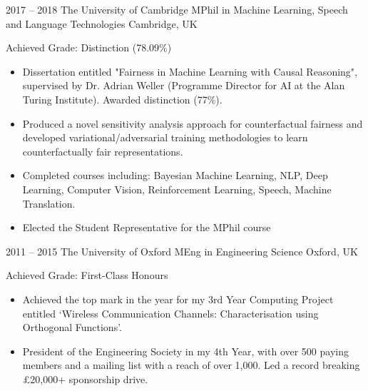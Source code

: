 \documentclass[]{friggeri-cv} %
\begin{document}
\begin{entrylist}


\entry
{2017 -- 2018}
{The University of Cambridge}
{MPhil {\normalfont in Machine Learning, Speech and Language Technologies }}
{Cambridge, UK}
{Achieved Grade: Distinction (78.09\%)
	\begin{itemize}
        \item Dissertation entitled "Fairness in Machine Learning with Causal Reasoning", supervised by Dr. Adrian Weller (Programme Director for AI at the Alan Turing Institute). Awarded distinction (77\%).
        \item Produced a novel sensitivity analysis approach for counterfactual fairness and developed variational/adversarial training methodologies to learn counterfactually fair representations. 
        \item Completed courses including: Bayesian Machine Learning, NLP, Deep Learning, Computer Vision, Reinforcement Learning, Speech, Machine Translation.
        \item Elected the Student Representative for the MPhil course
	\end{itemize}}



\entry
{2011 -- 2015}
{The University of Oxford}
{MEng {\normalfont in Engineering Science}}
{Oxford, UK}
{Achieved Grade: First-Class Honours
	\begin{itemize}
		\item Achieved the top mark in the year for my 3rd Year Computing Project entitled `Wireless Communication Channels: Characterisation using Orthogonal Functions'.
		\item President of the Engineering Society in my 4th Year, with over 500 paying members and a mailing list with a reach of over 1,000. Led a record breaking £20,000+ sponsorship drive.
	\end{itemize}}


\end{entrylist}
\end{document}
